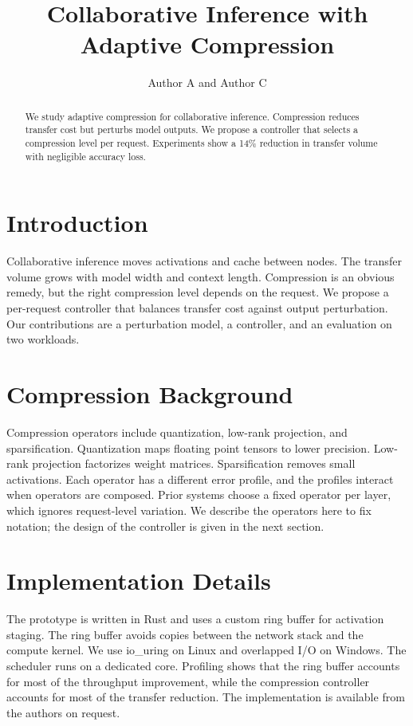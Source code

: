 \documentclass[conference]{IEEEtran}
\title{Collaborative Inference with Adaptive Compression}
\author{Author A and Author C}
\begin{document}
\maketitle

\begin{abstract}
We study adaptive compression for collaborative inference. Compression reduces transfer cost but perturbs model outputs. We propose a controller that selects a compression level per request. Experiments show a 14\% reduction in transfer volume with negligible accuracy loss.
\end{abstract}

\section{Introduction}
\label{sec:intro}
Collaborative inference moves activations and cache between nodes.
The transfer volume grows with model width and context length.
Compression is an obvious remedy, but the right compression level depends on the request.
We propose a per-request controller that balances transfer cost against output perturbation.
Our contributions are a perturbation model, a controller, and an evaluation on two workloads.

\section{Compression Background}
Compression operators include quantization, low-rank projection, and sparsification. Quantization maps floating point tensors to lower precision. Low-rank projection factorizes weight matrices. Sparsification removes small activations. Each operator has a different error profile, and the profiles interact when operators are composed. Prior systems choose a fixed operator per layer, which ignores request-level variation. We describe the operators here to fix notation; the design of the controller is given in the next section.

\section{Implementation Details}
The prototype is written in Rust and uses a custom ring buffer for activation staging. The ring buffer avoids copies between the network stack and the compute kernel. We use io\_uring on Linux and overlapped I/O on Windows. The scheduler runs on a dedicated core. Profiling shows that the ring buffer accounts for most of the throughput improvement, while the compression controller accounts for most of the transfer reduction. The implementation is available from the authors on request.
\end{document}
